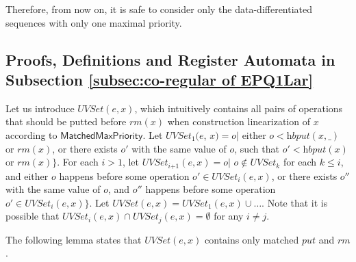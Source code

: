 Therefore, from now on, it is safe to consider only the data-differentiated sequences with only one maximal priority.





\subsection{Proofs, Definitions and Register Automata in Subsection \ref{subsec:co-regular of EPQ1Lar}}
\label{sec:appendix proof and definition in section co-regular of EPQ1Lar}


Let us introduce $\textit{UVSet}(e,x)$, which intuitively contains all pairs of operations that should be putted before $\textit{rm}(x)$ when construction linearization of $x$ according to $\mathsf{MatchedMaxPriority}$. Let $\textit{UVSet}_1(e$, $x) = o \vert$ either $o <{\textit{hb}} \textit{put}(x,\_)$ or $\textit{rm}(x)$, or there exists $o'$ with the same value of $o$, such that $o' <{\textit{hb}} \textit{put}(x)$ or $\textit{rm}(x) \}$. For each $i > 1$, let $\textit{UVSet}_{\textit{i+1}}(e,x) = o \vert$ $o \notin \textit{UVSet}_k$ for each $k \leq i$, and either $o$ happens before some operation $o' \in \textit{UVSet}_i(e,x)$, or there exists $o''$ with the same value of $o$, and $o''$ happens before some operation $o' \in \textit{UVSet}_i(e,x) \}$. Let $\textit{UVSet}(e,x) = \textit{UVSet}_1(e,x) \cup \ldots$. Note that it is possible that $\textit{UVSet}_i(e,x) \cap \textit{UVSet}_j(e,x) = \emptyset$ for any $i \neq j$.

The following lemma states that $\textit{UVSet}(e,x)$ contains only matched $\textit{put}$ and $\textit{rm}$.

